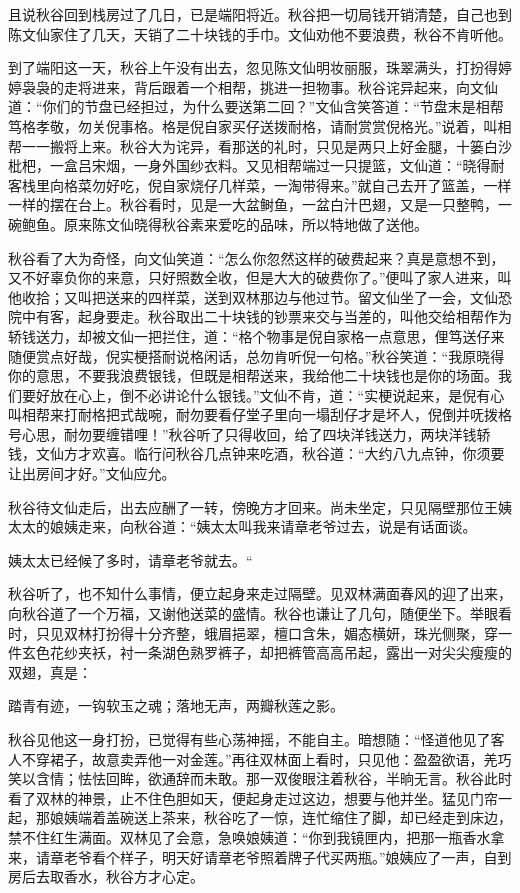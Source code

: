 \documentclass[12pt,UTF8]{ctexbook}
\begin{document}
{{{且说秋谷回到栈房过了几日，已是端阳将近。秋谷把一切局钱开销清楚，自己也到陈文仙家住了几天，天销了二十块钱的手巾。文仙劝他不要浪费，秋谷不肯听他。

到了端阳这一天，秋谷上午没有出去，忽见陈文仙明妆丽服，珠翠满头，打扮得婷婷袅袅的走将进来，背后跟着一个相帮，挑进一担物事。秋谷诧异起来，向文仙道：“你们的节盘已经担过，为什么要送第二回？”文仙含笑答道：“节盘末是相帮笃格孝敬，勿关倪事格。格是倪自家买仔送拨耐格，请耐赏赏倪格光。”说着，叫相帮一一搬将上来。秋谷大为诧异，看那送的礼时，只见是两只上好金腿，十篓白沙枇杷，一盒吕宋烟，一身外国纱衣料。又见相帮端过一只提篮，文仙道：“晓得耐客栈里向格菜勿好吃，倪自家烧仔几样菜，一淘带得来。”就自己去开了篮盖，一样一样的摆在台上。秋谷看时，见是一大盆鲥鱼，一盆白汁巴翅，又是一只整鸭，一碗鲍鱼。原来陈文仙晓得秋谷素来爱吃的品味，所以特地做了送他。

秋谷看了大为奇怪，向文仙笑道：“怎么你忽然这样的破费起来？真是意想不到，又不好辜负你的来意，只好照数全收，但是大大的破费你了。”便叫了家人进来，叫他收拾；又叫把送来的四样菜，送到双林那边与他过节。留文仙坐了一会，文仙恐院中有客，起身要走。秋谷取出二十块钱的钞票来交与当差的，叫他交给相帮作为轿钱送力，却被文仙一把拦住，道：“格个物事是倪自家格一点意思，俚笃送仔来随便赏点好哉，倪实梗搭耐说格闲话，总勿肯听倪一句格。”秋谷笑道：“我原晓得你的意思，不要我浪费银钱，但既是相帮送来，我给他二十块钱也是你的场面。我们要好放在心上，倒不必讲论什么银钱。”文仙不肯，道：“实梗说起来，是倪有心叫相帮来打耐格把式哉啘，耐勿要看仔堂子里向一塌刮仔才是坏人，倪倒并呒拨格号心思，耐勿要缠错哩！”秋谷听了只得收回，给了四块洋钱送力，两块洋钱轿钱，文仙方才欢喜。临行问秋谷几点钟来吃酒，秋谷道：“大约八九点钟，你须要让出房间才好。”文仙应允。

秋谷待文仙走后，出去应酬了一转，傍晚方才回来。尚未坐定，只见隔壁那位王姨太太的娘姨走来，向秋谷道：“姨太太叫我来请章老爷过去，说是有话面谈。

姨太太已经候了多时，请章老爷就去。“

秋谷听了，也不知什么事情，便立起身来走过隔壁。见双林满面春风的迎了出来，向秋谷道了一个万福，又谢他送菜的盛情。秋谷也谦让了几句，随便坐下。举眼看时，只见双林打扮得十分齐整，蛾眉挹翠，檀口含朱，媚态横妍，珠光侧聚，穿一件玄色花纱夹袄，衬一条湖色熟罗裤子，却把裤管高高吊起，露出一对尖尖瘦瘦的双翅，真是：

踏青有迹，一钩软玉之魂；落地无声，两瓣秋莲之影。

秋谷见他这一身打扮，已觉得有些心荡神摇，不能自主。暗想随：“怪道他见了客人不穿裙子，故意卖弄他一对金莲。”再往双林面上看时，只见他：盈盈欲语，羌巧笑以含情；怯怯回眸，欲通辞而未敢。那一双俊眼注着秋谷，半晌无言。秋谷此时看了双林的神景，止不住色胆如天，便起身走过这边，想要与他并坐。猛见门帘一起，那娘姨端着盖碗送上茶来，秋谷吃了一惊，连忙缩住了脚，却已经走到床边，禁不住红生满面。双林见了会意，急唤娘姨道：“你到我镜匣内，把那一瓶香水拿来，请章老爷看个样子，明天好请章老爷照着牌子代买两瓶。”娘姨应了一声，自到房后去取香水，秋谷方才心定。

}}}
\end{document}
